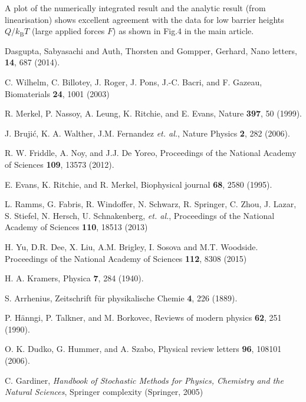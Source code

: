 \documentclass[twocolumn,pre,aps,showpacs,a4paper,floatfix,amssymb]{revtex4-1}
\begin{document}
A plot of the numerically integrated result and the analytic result (from linearisation) shows excellent agreement with the data for low barrier heights $Q/k_\text{B}T$ (large applied forces $F$) as shown in Fig.4 in the main article.

%
%

\begin{thebibliography}{21}

Dasgupta, Sabyasachi and Auth, Thorsten and Gompper, Gerhard,  Nano letters, {\bf 14}, 687 (2014).

C. Wilhelm, C. Billotey, J. Roger, J. Pons, J.-C. Bacri, and F. Gazeau, Biomaterials {\bf 24}, 1001 (2003)

R. Merkel, P. Nassoy, A. Leung, K. Ritchie, and E. Evans, Nature {\bf 397}, 50 (1999).

J. Bruji{\'c}, K. A. Walther, J.M. Fernandez \textit{et. al.}, Nature Physics {\bf 2}, 282 (2006).

R. W. Friddle, A. Noy, and J.J. De Yoreo, Proceedings of the National Academy of Sciences {\bf 109}, 13573 (2012).

E. Evans, K. Ritchie, and R. Merkel, Biophysical journal {\bf 68}, 2580 (1995).

L. Ramms, G. Fabris, R. Windoffer, N. Schwarz, R. Springer, C. Zhou, J. Lazar, S. Stiefel, N. Hersch, U. Schnakenberg, \textit{et. al.}, Proceedings of the National Academy of Sciences {\bf 110}, 18513 (2013)

H. Yu, D.R. Dee, X. Liu, A.M. Brigley, I. Sosova and M.T. Woodside. Proceedings of the National Academy of Sciences {\bf 112}, 8308 (2015)

H. A. Kramers, Physica {\bf 7}, 284 (1940).

S. Arrhenius, Zeitschrift f\"ur physikalische Chemie {\bf 4}, 226 (1889).

P. H\"anngi, P. Talkner, and M. Borkovec, Reviews of modern physics {\bf 62}, 251 (1990).

O. K. Dudko, G. Hummer, and A. Szabo, Physical review letters {\bf 96}, 108101 (2006).

C. Gardiner, \textit{Handbook of Stochastic Methods for Physics, Chemistry and the Natural Sciences}, Springer complexity (Springer, 2005)


\end{thebibliography}
\end{document}
